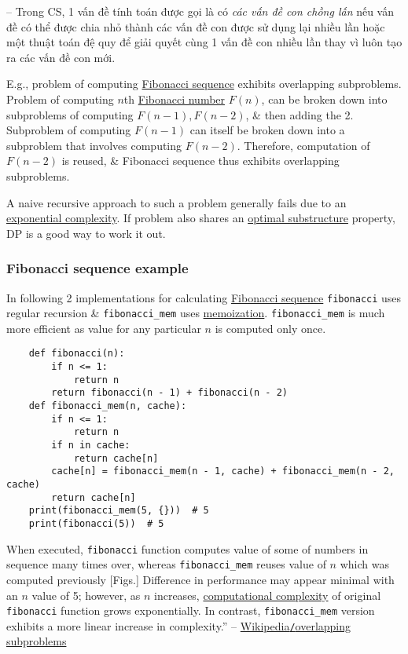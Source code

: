 \documentclass{article}
\begin{document}
-- Trong CS, 1 vấn đề tính toán được gọi là có {\it các vấn đề con chồng lấn} nếu vấn đề có thể được chia nhỏ thành các vấn đề con được sử dụng lại nhiều lần hoặc một thuật toán đệ quy để giải quyết cùng 1 vấn đề con nhiều lần thay vì luôn tạo ra các vấn đề con mới.

E.g., problem of computing \href{https://en.wikipedia.org/wiki/Fibonacci_sequence}{Fibonacci sequence} exhibits overlapping subproblems. Problem of computing $n$th \href{https://en.wikipedia.org/wiki/Fibonacci_number}{Fibonacci number} $F(n)$, can be broken down into subproblems of computing $F(n - 1),F(n - 2)$, \& then adding the 2. Subproblem of computing $F(n - 1)$ can itself be broken down into a subproblem that involves computing $F(n - 2)$. Therefore, computation of $F(n - 2)$ is reused, \& Fibonacci sequence thus exhibits overlapping subproblems.

A naive recursive approach to such a problem generally fails due to an \href{https://en.wikipedia.org/wiki/Exponential_time}{exponential complexity}. If problem also shares an \href{https://en.wikipedia.org/wiki/Optimal_substructure}{optimal substructure} property, DP is a good way to work it out.

\subsubsection{Fibonacci sequence example}
In following 2 implementations for calculating \href{https://en.wikipedia.org/wiki/Fibonacci_sequence}{Fibonacci sequence} {\tt fibonacci} uses regular recursion \& \verb|fibonacci_mem| uses \href{https://en.wikipedia.org/wiki/Memoization}{memoization}. \verb|fibonacci_mem| is much more efficient as value for any particular $n$ is computed only once.
\begin{verbatim}
	def fibonacci(n):
	    if n <= 1:
	        return n
	    return fibonacci(n - 1) + fibonacci(n - 2)
	def fibonacci_mem(n, cache):
	    if n <= 1:
	        return n
	    if n in cache:
	        return cache[n]
	    cache[n] = fibonacci_mem(n - 1, cache) + fibonacci_mem(n - 2, cache)
	    return cache[n]
	print(fibonacci_mem(5, {}))  # 5
	print(fibonacci(5))  # 5
\end{verbatim}
When executed, {\tt fibonacci} function computes value of some of numbers in sequence many times over, whereas \verb|fibonacci_mem| reuses value of $n$ which was computed previously [Figs.] Difference in performance may appear minimal with an $n$ value of 5; however, as $n$ increases, \href{https://en.wikipedia.org/wiki/Computational_complexity}{computational complexity} of original {\tt fibonacci} function grows exponentially. In contrast, \verb|fibonacci_mem| version exhibits a more linear increase in complexity.'' -- \href{https://en.wikipedia.org/wiki/Overlapping_subproblems}{Wikipedia{\tt/}overlapping subproblems}
\end{document}
